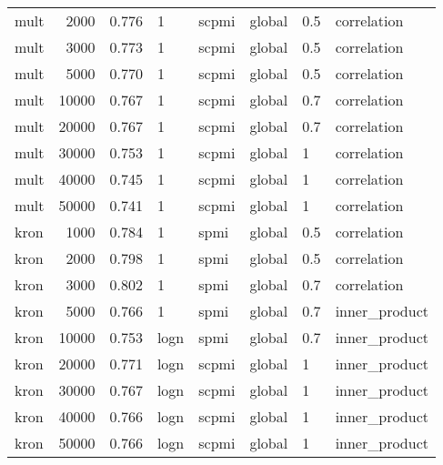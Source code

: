 \begin{tabular}{lrrlllll}
    mult &            2000 &  0.776 &     1 &  scpmi &  global &  0.5 &    correlation \\
    mult &            3000 &  0.773 &     1 &  scpmi &  global &  0.5 &    correlation \\
    mult &            5000 &  0.770 &     1 &  scpmi &  global &  0.5 &    correlation \\
    mult &           10000 &  0.767 &     1 &  scpmi &  global &  0.7 &    correlation \\
    mult &           20000 &  0.767 &     1 &  scpmi &  global &  0.7 &    correlation \\
    mult &           30000 &  0.753 &     1 &  scpmi &  global &    1 &    correlation \\
    mult &           40000 &  0.745 &     1 &  scpmi &  global &    1 &    correlation \\
    mult &           50000 &  0.741 &     1 &  scpmi &  global &    1 &    correlation \\
    kron &            1000 &  0.784 &     1 &   spmi &  global &  0.5 &    correlation \\
    kron &            2000 &  0.798 &     1 &   spmi &  global &  0.5 &    correlation \\
    kron &            3000 &  0.802 &     1 &   spmi &  global &  0.7 &    correlation \\
    kron &            5000 &  0.766 &     1 &   spmi &  global &  0.7 &  inner\_product \\
    kron &           10000 &  0.753 &  logn &   spmi &  global &  0.7 &  inner\_product \\
    kron &           20000 &  0.771 &  logn &  scpmi &  global &    1 &  inner\_product \\
    kron &           30000 &  0.767 &  logn &  scpmi &  global &    1 &  inner\_product \\
    kron &           40000 &  0.766 &  logn &  scpmi &  global &    1 &  inner\_product \\
    kron &           50000 &  0.766 &  logn &  scpmi &  global &    1 &  inner\_product \\
\bottomrule
\end{tabular}
